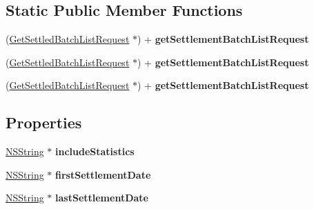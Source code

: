 \subsection*{Static Public Member Functions}
\begin{DoxyCompactItemize}
\item 
\hypertarget{interface_get_settled_batch_list_request_a118e1d1e68b65471a58db828f01b7f24}{
(\hyperlink{interface_get_settled_batch_list_request}{GetSettledBatchListRequest} $\ast$) + {\bfseries getSettlementBatchListRequest}}
\label{interface_get_settled_batch_list_request_a118e1d1e68b65471a58db828f01b7f24}

\item 
\hypertarget{interface_get_settled_batch_list_request_a118e1d1e68b65471a58db828f01b7f24}{
(\hyperlink{interface_get_settled_batch_list_request}{GetSettledBatchListRequest} $\ast$) + {\bfseries getSettlementBatchListRequest}}
\label{interface_get_settled_batch_list_request_a118e1d1e68b65471a58db828f01b7f24}

\item 
\hypertarget{interface_get_settled_batch_list_request_a118e1d1e68b65471a58db828f01b7f24}{
(\hyperlink{interface_get_settled_batch_list_request}{GetSettledBatchListRequest} $\ast$) + {\bfseries getSettlementBatchListRequest}}
\label{interface_get_settled_batch_list_request_a118e1d1e68b65471a58db828f01b7f24}

\end{DoxyCompactItemize}
\subsection*{Properties}
\begin{DoxyCompactItemize}
\item 
\hypertarget{interface_get_settled_batch_list_request_aa887f995c829ba30c5614f10b12b4fd4}{
\hyperlink{class_n_s_string}{NSString} $\ast$ {\bfseries includeStatistics}}
\label{interface_get_settled_batch_list_request_aa887f995c829ba30c5614f10b12b4fd4}

\item 
\hypertarget{interface_get_settled_batch_list_request_a80e18898e5fc0889b5891d61bf6e98cd}{
\hyperlink{class_n_s_string}{NSString} $\ast$ {\bfseries firstSettlementDate}}
\label{interface_get_settled_batch_list_request_a80e18898e5fc0889b5891d61bf6e98cd}

\item 
\hypertarget{interface_get_settled_batch_list_request_a28ffc1efbaed61b6416274055bb7821a}{
\hyperlink{class_n_s_string}{NSString} $\ast$ {\bfseries lastSettlementDate}}
\label{interface_get_settled_batch_list_request_a28ffc1efbaed61b6416274055bb7821a}

\end{DoxyCompactItemize}


